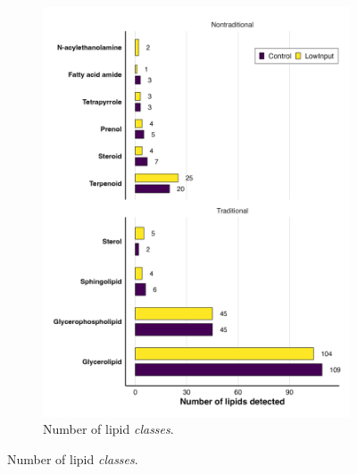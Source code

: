 \documentclass[10pt,letterpaper]{article}
\begin{document}
\begin{figure}[htp]
\begin{subfigure}[t]{0.48\textwidth}
    \includegraphics[width=\linewidth]{fig/supp/SuppFig_3B_trad_nontrad_counts.png}
    \caption{Number of lipid \textit{classes}.}
    \label{fig:S3B}
  \end{subfigure}

  \vspace{1em}


\end{figure}
\end{document}
